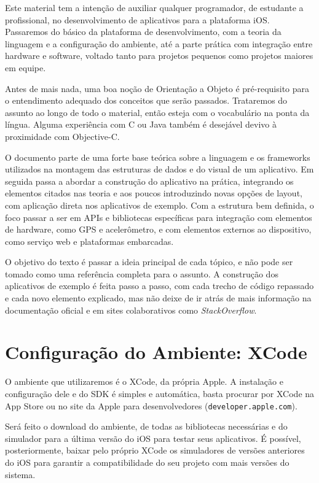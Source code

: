 \documentclass[a4paper,12pt,brazil,doubleside]{book}
\begin{document}
\begin{singlespace}
Este material tem a intenção de auxiliar qualquer programador, de estudante a profissional, no desenvolvimento de aplicativos para a plataforma iOS. Passaremos do básico da plataforma de desenvolvimento, com a teoria da linguagem e a configuração do ambiente, até a parte prática com integração entre hardware e software, voltado tanto para projetos pequenos como projetos maiores em equipe.

Antes de mais nada, uma boa noção de Orientação a Objeto é pré-requisito para o entendimento adequado dos conceitos que serão passados. Trataremos do assunto ao longo de todo o material, então esteja com o vocabulário na ponta da língua. Alguma experiência com C ou Java também é desejável devivo à proximidade com Objective-C.

O documento parte de uma forte base teórica sobre a linguagem e os frameworks utilizados na montagem das estruturas de dados e do visual de um aplicativo. Em seguida passa a abordar a construção do aplicativo na prática, integrando os elementos citados nas teoria e aos poucos introduzindo novas opções de layout, com aplicação direta nos aplicativos de exemplo. Com a estrutura bem definida, o foco passar a ser em APIs e bibliotecas específicas para integração com elementos de hardware, como GPS e acelerômetro, e com elementos externos ao dispositivo, como serviço web e plataformas embarcadas.

O objetivo do texto é passar a ideia principal de cada tópico, e não pode ser tomado como uma referência completa para o assunto. A construção dos aplicativos de exemplo é feita passo a passo, com cada trecho de código repassado e cada novo elemento explicado, mas não deixe de ir atrás de mais informação na documentação oficial e em sites colaborativos como \emph{StackOverflow}.


\section{Configuração do Ambiente: XCode}

O ambiente que utilizaremos é o XCode, da própria Apple. A instalação e configuração dele e do SDK é simples e automática, basta procurar por XCode na App Store ou no site da Apple para desenvolvedores (\texttt{developer.apple.com}).

Será feito o download do ambiente, de todas as bibliotecas necessárias e do simulador para a última versão do iOS para testar seus aplicativos. É possível, posteriormente, baixar pelo próprio XCode os simuladores de versões anteriores do iOS para garantir a compatibilidade do seu projeto com mais versões do sistema.\\


\end{singlespace}
\end{document}
